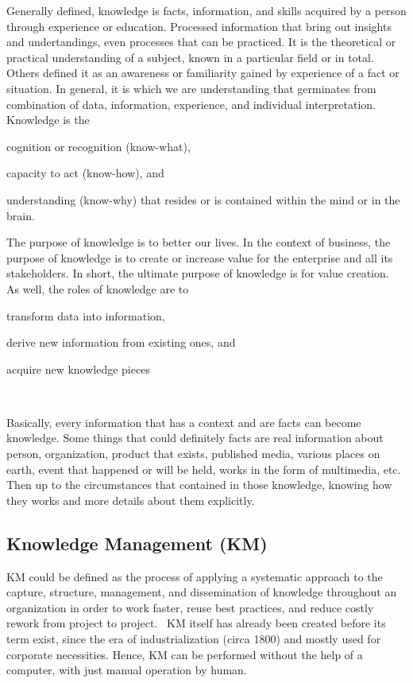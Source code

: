 Generally defined, knowledge is facts, information, and skills acquired by a person through experience or education.
Processed information that bring out insights and undertandings, even processes that can be practiced.
It is the theoretical or practical understanding of a subject, known in a particular field or in total.
Others defined it as an awareness or familiarity gained by experience of a fact or situation.
In general, it is which we are understanding that germinates from combination of data, information, experience, and individual interpretation.~\autocite{BD2015Knowledge}
Knowledge is the
\begin{inparaenum}
\item cognition or recognition (know-what),
\item capacity to act (know-how), and
\item understanding (know-why) that resides or is contained within the mind or in the brain.
\end{inparaenum}
The purpose of knowledge is to better our lives.
In the context of business, the purpose of knowledge is to create or increase value for the enterprise and all its stakeholders.
In short, the ultimate purpose of knowledge is for value creation.~\autocite{Liew2007Understanding}
As well, the roles of knowledge are to
\begin{inparaenum}
\item transform data into information,
\item derive new information from existing ones, and
\item acquire new knowledge pieces
\end{inparaenum}~\autocite{Pomerol2001Relation}

Basically, every information that has a context and are facts can become knowledge.
Some things that could definitely facts are real information about person, organization, product that exists, published media, various places on earth, event that happened or will be held, works in the form of multimedia, etc.
Then up to the circumstances that contained in those knowledge, knowing how they works and more details about them explicitly.

\subsection{Knowledge Management (KM)}

\ac{KM} could be defined as the process of applying a systematic approach to the capture, structure, management, and dissemination of knowledge throughout an organization in order to work faster, reuse best practices, and reduce costly rework from project to project.~\autocite{Dalkir2005KM}
\ac{KM} itself has already been created before its term exist, since the era of industrialization (circa 1800) and mostly used for corporate necessities.
Hence, \ac{KM} can be performed without the help of a computer, with just manual operation by human.

